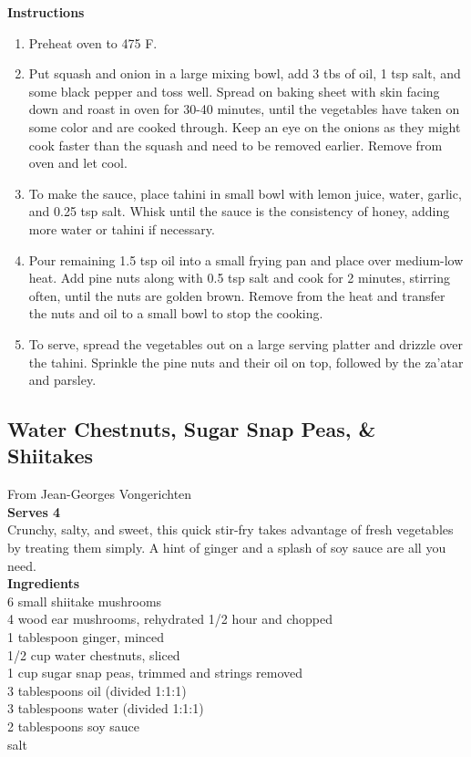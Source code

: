 \documentclass{article}
\numberwithin{figure}{section}
\numberwithin{equation}{section}
\begin{document}
{\bf Instructions}
\begin{enumerate}
\item Preheat oven to 475 F.

\item Put squash and onion in a large mixing bowl, add 3 tbs of oil, 1 tsp salt, and some black pepper and toss well. Spread on baking sheet with skin facing down and roast in oven for 30-40 minutes, until the vegetables have taken on some color and are cooked through. Keep an eye on the onions as they might cook faster than the squash and need to be removed earlier. Remove from oven and let cool.
\item To make the sauce, place tahini in small bowl with lemon juice, water, garlic, and 0.25 tsp salt. Whisk until the sauce is the consistency of honey, adding more water or tahini if necessary.
\item Pour remaining 1.5 tsp oil into a small frying pan and place over medium-low heat. Add pine nuts along with 0.5 tsp salt and cook for 2 minutes, stirring often, until the nuts are golden brown. Remove from the heat and transfer the nuts and oil to a small bowl to stop the cooking.
\item To serve, spread the vegetables out on a large serving platter and drizzle over the tahini. Sprinkle the pine nuts and their oil on top, followed by the za'atar and parsley.
\end{enumerate}


\pagebreak
\subsection{Water Chestnuts, Sugar Snap Peas, \& Shiitakes}
From Jean-Georges Vongerichten\\
{\bf Serves 4}\\

Crunchy, salty, and sweet, this quick stir-fry takes advantage of fresh vegetables by treating them simply. A hint of ginger and a splash of soy sauce are all you need.\\

{\bf Ingredients}\\
6 small shiitake mushrooms\\
4 wood ear mushrooms, rehydrated 1/2 hour and chopped\\
1 tablespoon ginger, minced\\
1/2 cup water chestnuts, sliced\\
1 cup sugar snap peas, trimmed and strings removed\\
3 tablespoons oil (divided 1:1:1)\\
3 tablespoons water (divided 1:1:1)\\
2 tablespoons soy sauce\\
salt\\
\end{document}
